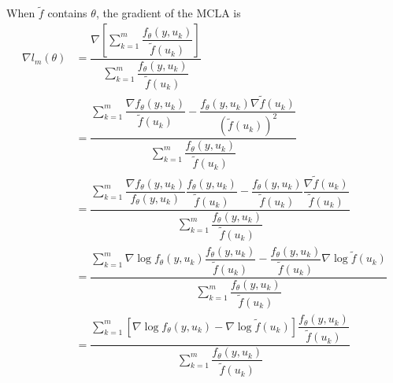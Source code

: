 \documentclass{article}
\begin{document}
When $\tilde{f}$ contains $\theta$, the gradient of the MCLA is
\begin{align}
\nabla l_m(\theta) &= \dfrac{ \nabla \left[ \sum_{k=1}^m  \dfrac{ f_\theta(y,u_k)   }{\tilde{f}(u_k)}  \right] }{\sum_{k=1}^m  \dfrac{ f_\theta(y,u_k)   }{\tilde{f}(u_k)}} \\
&= \dfrac{   \sum_{k=1}^m  \dfrac{\nabla f_\theta(y,u_k)   }{\tilde{f}(u_k)} - \dfrac{ f_\theta(y,u_k)  \nabla \tilde{f}(u_k) }{\left(\tilde{f}(u_k) \right)^2 } }{\sum_{k=1}^m  \dfrac{ f_\theta(y,u_k)   }{\tilde{f}(u_k)}} \\
&= \dfrac{   \sum_{k=1}^m  \dfrac{\nabla f_\theta(y,u_k)}{f_\theta(y,u_k)} \dfrac{f_\theta(y,u_k)}{\tilde{f}(u_k)} -
 \dfrac{ f_\theta(y,u_k)}{\tilde{f}(u_k)} \dfrac{ \nabla \tilde{f}(u_k) }{\tilde{f}(u_k) } }{\sum_{k=1}^m  \dfrac{ f_\theta(y,u_k)   }{\tilde{f}(u_k)}} \\
&= \dfrac{   \sum_{k=1}^m  \nabla \log f_\theta(y,u_k) \dfrac{f_\theta(y,u_k)}{\tilde{f}(u_k)} -
 \dfrac{ f_\theta(y,u_k)}{\tilde{f}(u_k)}  \nabla \log \tilde{f}(u_k)  }{\sum_{k=1}^m  \dfrac{ f_\theta(y,u_k)   }{\tilde{f}(u_k)}} \\
&= \dfrac{   \sum_{k=1}^m \left[ \nabla \log f_\theta(y,u_k)  -
   \nabla \log \tilde{f}(u_k)   \right]  \dfrac{ f_\theta(y,u_k)}{\tilde{f}(u_k)}  }{\sum_{k=1}^m  \dfrac{ f_\theta(y,u_k)   }{\tilde{f}(u_k)}} 
\end{align}
\end{document}
